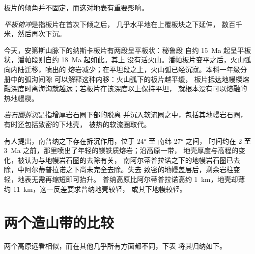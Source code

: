 板片的倾角并不固定，而这对地表有重要影响。

\begin{definition}[平板俯冲]\label{def:b2:himalaya-andes:flat-slab}
\emph{平板俯冲}是指板片在首次下倾之后，
几乎水平地在上覆板块之下延伸，
数百千米，然后再次下沉。
\end{definition}

今天，安第斯山脉下的纳斯卡板片有两段呈平板状：秘鲁段
自约 \qty{15}{Ma} 起呈平板状，潘帕段则自约 \qty{18}{Ma} 起如此。其上
没有活火山。潘帕板片变平之后，火山弧向内陆迁移，喷出的
熔岩减少；在平坦段之上，火山弧已经沉寂。本科一年级分册中的弧沟间隙
可以解释这种内移：火山弧下的板片越平缓，
板片抵达地幔楔熔融深度时离海沟就越远；若板片在该深度以上保持平坦，
就根本没有可以熔融的热地幔楔。

\begin{definition}[岩石圈拆沉]\label{def:b2:himalaya-andes:delamination}
\emph{岩石圈拆沉}是指增厚岩石圈下部的脱离
并沉入软流圈之中，包括其地幔岩石圈，有时还包括致密的下地壳，
被热的软流圈取代。
\end{definition}

有人提出，南普纳之下存在拆沉作用，位于 \ang{24} 至 南纬 \ang{27} 之间，
时间约在 2 至 \qty{3}{Ma} 之前，那里喷出了年轻的镁铁质熔岩；沿高原一带，
地壳厚度与高程的变化，被认为与地幔岩石圈的去除有关，
南阿尔蒂普拉诺之下的地幔岩石圈已去除，中阿尔蒂普拉诺之下尚未完全去除。失去
致密的地幔盖层后，剩余岩柱变轻，地表无需再缩短即可抬升。
普纳高原比阿尔蒂普拉诺高约 \qty{1}{km}，地壳却薄约
\qty{11}{km}，这一反差要求普纳地壳较轻，
或其下地幔较轻。

\section{两个造山带的比较}\label{sec:b2:himalaya-andes:compared}

两个高原远看相似，而在其他几乎所有方面都不同，下表
将其归纳如下。

